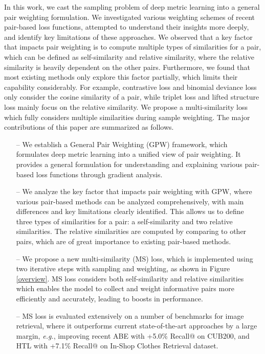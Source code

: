 \documentclass[10pt,twocolumn,letterpaper]{article}
\begin{document}
In this work, we cast the sampling problem of deep metric learning into a general pair weighting formulation. We investigated various weighting schemes of recent pair-based loss functions, attempted to understand their insights more deeply, and identify key limitations of these approaches. 
We observed that a key factor that impacts pair weighting is to compute multiple types of similarities for a pair, which can be defined  as self-similarity and relative similarity, where the relative similarity is heavily dependent on the other pairs. 
Furthermore, we found that most existing methods only explore this factor partially, which limits their capability considerably. For example, contrastive loss \cite{contrastive} and binomial deviance loss \cite{binomial} only consider the cosine similarity of a pair, while triplet loss \cite{Hoffer2015DeepML} and lifted structure loss \cite{lifted-structured-loss} mainly focus on the relative similarity. We propose a multi-similarity loss which fully considers multiple similarities during sample weighting. The major contributions of this paper are summarized as follows.  
\begin{itemize}
\item[--] We establish a General Pair Weighting (GPW) framework, which formulates deep metric learning into a unified view of pair weighting. It provides a general formulation for understanding and explaining various pair-based loss functions through gradient analysis.
\item[--] We analyze the key factor that impacts pair weighting with GPW, where various pair-based methods can be analyzed comprehensively, with main differences and key limitations clearly identified. This allows us to define three types of similarities for a pair: a self-similarity and two relative similarities. The relative similarities are computed by comparing to other pairs, which are of great importance to existing pair-based methods. 
\item[--] We propose a new multi-similarity (MS) loss,  which is implemented using two iterative steps with sampling and weighting, as shown in Figure \ref{overview}. MS loss considers both self-similarity and relative similarities which enables the model to collect and weight informative pairs more efficiently and accurately, leading to boosts in performance.
\item[--] MS loss is evaluated extensively on a number of benchmarks for image retrieval,
where it outperforms current state-of-the-art approaches by a large margin, {\it e.g.}, improving recent  ABE \cite{Kim_2018_ECCV} with +5.0\% Recall@ on CUB200, and HTL \cite{HTL} with +7.1\% Recall@ on In-Shop Clothes Retrieval dataset.

\end{itemize}
\end{document}
